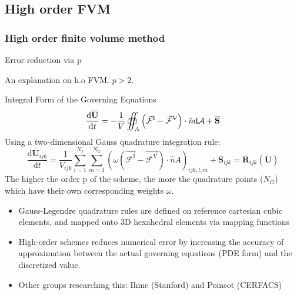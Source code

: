 \documentclass{beamer}
\begin{document}
\subsection{High order FVM}
\begin{frame}%
\frametitle{High order finite volume method}
\begin{minipage}[t][1\textheight]{1\textwidth}
\vspace{-20pt}
\begin{exampleblock}{Error reduction via p}
\tiny

An explanation on h.o FVM.  $ p > 2 $.

\begin{block}{Integral Form of the Governing Equations}
     \[
      \frac{\mathrm{d}\overline{\mathbf{U}}}{\mathrm{d}t} = 
      - \frac{1}{V} \oiint_A \left( \vec{\mathcal{F}}^{\rm I} - 
      \vec{\mathcal{F}}^{\rm V} \right) \cdot \hat{n} \mathrm{d}\mathcal{A} + 
      \overline{\mathbf{S}}
     \] 
    Using a two-dimensional Gauss quadrature integration rule:
    \[  \frac{\mathrm{d}\overline{\mathbf{U}}_{ijk}}{\mathrm{d}t} = 
       \frac{1}{{V}_{ijk}} \sum_{l=1}^{N_f}     
      \sum_{m=1}^{N_G} \left( \omega \left(\vec{\mathcal{F}^{\mathrm{I}}} - 
      \vec{\mathcal{F}^{\mathrm{V}}} \right)\cdot \hat{n} {A} \right)_{ijk,l,m} 
      + \overline{\mathbf{S}}_{ijk} 
      = \overline{\mathbf{R}}_{ijk}  \left( \overline{\mathbf{U}} \right) \]
    The higher the order p of the scheme, the more the quadrature points ($ N_G $) which have their own corresponding weights $ \omega $.
\end{block}


\begin{itemize}
\tiny
\item Gauss-Legendre quadrature rules are defined on reference cartesian cubic elements, and mapped onto 3D hexahedral elements via mapping functions
\item High-order schemes reduces numerical error by increasing the accuracy of approximation between the actual governing equations (PDE form) and the discretized value.
\item Other groups researching this: Ihme (Stanford) and Poinsot (CERFACS)
\end{itemize}
\end{exampleblock}
\end{minipage}


\end{frame}

\end{document}
